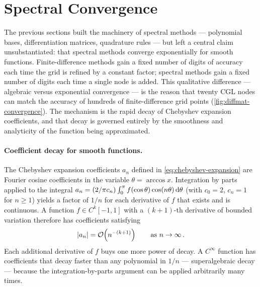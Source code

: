 \section{Spectral Convergence}
\label{sec:spec-convergence}

The previous sections built the machinery of spectral methods ---
polynomial bases, differentiation matrices, quadrature rules --- but
left a central claim unsubstantiated: that spectral methods converge
exponentially for smooth functions.  Finite-difference methods gain a
fixed number of digits of accuracy each time the grid is refined by a
constant factor; spectral methods gain a fixed number of digits each
time a single node is added.  This qualitative difference --- algebraic
versus exponential convergence --- is the reason that twenty CGL nodes
can match the accuracy of hundreds of finite-difference grid points
(\cref{fig:diffmat-convergence}).  The mechanism is the rapid decay of
Chebyshev expansion coefficients, and that decay is governed entirely
by the smoothness and analyticity of the function being approximated.

\paragraph{Coefficient decay for smooth functions.}

The Chebyshev expansion coefficients $a_n$ defined in
\cref{eq:chebyshev-expansion} are Fourier cosine coefficients in the
variable $\theta = \arccos x$.  Integration by parts applied to the
integral $a_n = (2/\pi c_n)\int_0^\pi
f(\cos\theta)\cos(n\theta)\,\mathrm{d}\theta$ (with $c_0 = 2$, $c_n = 1$ for
$n \geq 1$) yields a factor of $1/n$ for
each derivative of $f$ that exists and is continuous.  A function
$f \in C^k[-1,1]$ with a $(k+1)$-th derivative of bounded variation
therefore has coefficients satisfying
%
\begin{equation}
  \left\lvert a_n \right\rvert = \mathcal{O}\!\left(n^{-(k+1)}\right)
  \qquad \text{as } n \to \infty \,.
  \label{eq:coeff-decay-smooth}
\end{equation}
%
Each additional derivative of $f$ buys one more power of decay.  A
$C^\infty$ function has coefficients that decay faster than any
polynomial in $1/n$ --- superalgebraic decay --- because the
integration-by-parts argument can be applied arbitrarily many times.

